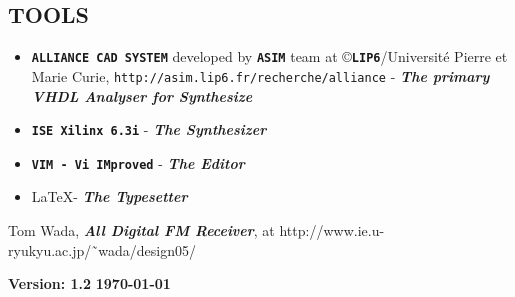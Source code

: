 \documentclass[a4paper,10pt]{article}
\begin{document}
\subsection{TOOLS}

\begin{itemize}

\item \textbf{\texttt{ALLIANCE CAD SYSTEM}} developed by \textbf{\texttt{ASIM}}
      team at \copyright \textbf{\texttt{LIP6}}/Universit\'{e} Pierre et
      Marie Curie,
      \texttt{http://asim.lip6.fr/recherche/alliance} 
      - \textbf{\textit{The primary VHDL Analyser for Synthesize}}

\item \textbf{\texttt{ISE Xilinx 6.3i}} - \textbf{\textit{The Synthesizer}}

\item \textbf{\texttt{VIM - Vi IMproved}}
      - \textbf{\textit{The Editor}}

\item \LaTeX - \textbf{\textit{The Typesetter}}

\end{itemize}

\begin{thebibliography}{1}

 Tom Wada,
	\textbf{\textit{ All Digital FM Receiver}}, at
	http://www.ie.u-ryukyu.ac.jp/\~\ wada/design05/

\end{thebibliography}

\vspace{01cm}

\begin{tabbing}
\textbf{Version: 1.2}  \` \textbf{\today}
\end{tabbing}
\end{document}
